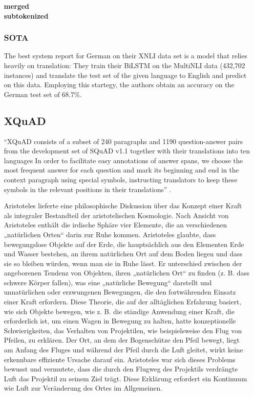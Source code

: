 \textbf{merged} \\

\textbf{subtokenized} \\

\subsubsection{SOTA}

The best system \cite{conneau2018xnli} report for German on their XNLI data set is a model that relies heavily on translation:
They train their BiLSTM on the MultiNLI data (432,702 instances) and translate the test set of the given language to English and predict on this data.
Employing this startegy, the authors obtain an accuracy on the German test set of 68.7\%.



\subsection{XQuAD}

``XQuAD consists of a subset of 240 paragraphs and 1190 question-answer pairs from the development set of SQuAD v1.1 together with their translations into ten languages \textelp{} In order to facilitate easy annotations of answer spans, we choose the most frequent answer for each question and mark its beginning and end in the context paragraph using special symbols, instructing translators to keep these symbols in the relevant positions in their translations'' \cite{artetxe2019cross}.

\begin{examples}
	\label{ex:xquad}
	\item Aristoteles lieferte eine philosophische Diskussion über das Konzept einer Kraft als integraler Bestandteil der aristotelischen Kosmologie. Nach Ansicht von Aristoteles enthält die irdische Sphäre vier Elemente, die an verschiedenen „natürlichen Orten“ darin zur Ruhe kommen. Aristoteles glaubte, dass bewegungslose Objekte auf der Erde, die hauptsächlich aus den Elementen Erde und Wasser bestehen, an ihrem natürlichen Ort auf dem Boden liegen und dass sie so bleiben würden, wenn man sie in Ruhe lässt. Er unterschied zwischen der angeborenen Tendenz von Objekten, ihren „natürlichen Ort“ zu finden (z. B. dass schwere Körper fallen), was eine „natürliche Bewegung“ darstellt und unnatürlichen oder erzwungenen Bewegungen, die den fortwährenden Einsatz einer Kraft erfordern. Diese Theorie, die auf der alltäglichen Erfahrung basiert, wie sich Objekte bewegen, wie z. B. die ständige Anwendung einer Kraft, die erforderlich ist, um einen Wagen in Bewegung zu halten, hatte konzeptionelle Schwierigkeiten, das Verhalten von Projektilen, wie beispielsweise den Flug von Pfeilen, zu erklären. Der Ort, an dem der Bogenschütze den Pfeil bewegt, liegt am Anfang des Fluges und während der Pfeil durch die Luft gleitet, wirkt keine erkennbare effiziente Ursache darauf ein. Aristoteles war sich dieses Problems bewusst und vermutete, dass die durch den Flugweg des Projektils verdrängte Luft das Projektil zu seinem Ziel trägt. Diese Erklärung erfordert ein Kontinuum wie Luft zur Veränderung des Ortes im Allgemeinen.
\end{examples}

